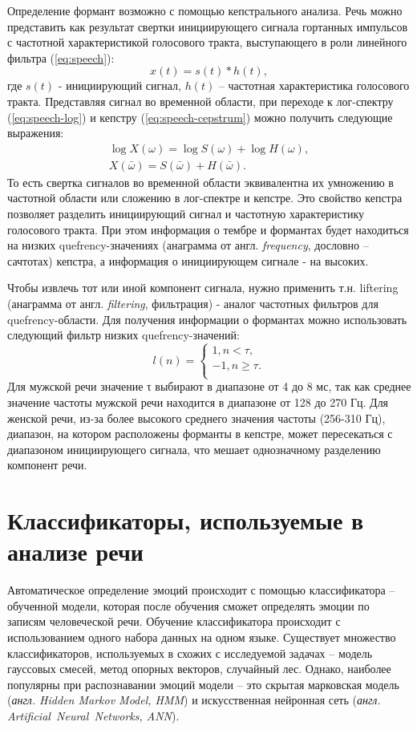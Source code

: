 Определение формант возможно с помощью кепстрального анализа. Речь можно представить как результат свертки инициирующего сигнала гортанных импульсов с частотной характеристикой голосового тракта, выступающего в роли линейного фильтра (\ref{eq:speech}):
\begin{equation}\label{eq:speech}
	x(t) = s(t) * h(t),
\end{equation}
где $s(t)$ - инициирующий сигнал, $h(t)$ -- частотная характеристика голосового тракта. Представляя сигнал во временной области, при переходе к лог-спектру (\ref{eq:speech-log}) и кепстру (\ref{eq:speech-cepstrum}) можно получить следующие выражения:
\begin{gather}
	\log X(\omega) = \log S(\omega) + \log H(\omega) \label{eq:speech-log},\\
	X(\bar{\omega}) = S(\bar{\omega}) + H(\bar{\omega}) \label{eq:speech-cepstrum}.
\end{gather}
То есть свертка сигналов во временной области эквивалентна их умножению в частотной области или сложению в лог-спектре и кепстре. Это свойство кепстра позволяет разделить инициирующий сигнал и частотную характеристику голосового тракта. При этом информация о тембре и формантах будет находиться на низких quefrency-значениях (анаграмма от англ. \textit{frequency}, дословно -- сачтотах) кепстра, а информация о инициирующем сигнале - на высоких.

Чтобы извлечь тот или иной компонент сигнала, нужно применить т.н. liftering (анаграмма от англ. \textit{filtering}, фильтрация) - аналог частотных фильтров для quefrency-области. Для получения информации о формантах можно использовать следующий фильтр низких quefrency-значений:
\begin{equation}
	l(n)
	= 
	\begin{cases}
		1,  n < \tau,\\
		-1,  n \ge \tau.\\
	\end{cases}
\end{equation}
Для мужской речи значение τ выбирают в диапазоне от 4 до 8 мс, так как среднее значение частоты мужской речи находится в диапазоне от 128 до 270 Гц. Для женской речи, из-за более высокого среднего значения частоты (256-310 Гц), диапазон, на котором расположены форманты в кепстре, может пересекаться с диапазоном инициирующего сигнала, что мешает однозначному разделению компонент речи.

\section{Классификаторы, используемые в анализе речи}
Автоматическое определение эмоций происходит с помощью классификатора -- обученной модели, которая после обучения сможет определять эмоции по записям человеческой речи. Обучение классификатора происходит с использованием одного набора данных на одном языке. Существует множество классификаторов, используемых в схожих с исследуемой задачах -- модель гауссовых смесей, метод опорных векторов, случайный лес. Однако, наиболее популярны при распознавании эмоций модели -- это скрытая марковская модель (\textit{англ. Hidden Markov Model, HMM}) и искусственная нейронная сеть (\textit{англ. Artificial~Neural~Networks, ANN}).

